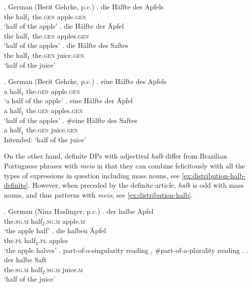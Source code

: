 \ex. German (Berit Gehrke, p.c.)\label{ex:distribution-halfte-def}
\ag. die Hälfte des Apfels\label{ex:distribution-halfte-sg-def}\\
the half$_1$ the\textsc{.gen} apple\textsc{.gen} \\
`half of the apple'
\bg. die Hälfte der Äpfel\label{ex:distribution-halfte-pl-def}\\
the half$_1$ the\textsc{.gen}  apples\textsc{.gen} \\
`half of the apples'
\bg. die Hälfte des Saftes\label{ex:distribution-halfte-mass-def}\\
the half$_1$ the\textsc{.gen}  juice\textsc{.gen} \\
`half of the juice'

\ex. German (Berit Gehrke, p.c.)\label{ex:distribution-halfte}
\ag. eine Hälfte des Apfels\label{ex:distribution-halfte-sg}\\
a half$_1$ the\textsc{.gen} apple\textsc{.gen} \\
`a half of the apple'
\bg. eine Hälfte der Äpfel\label{ex:distribution-halfte-pl}\\
a half$_1$ the\textsc{.gen}  apples\textsc{.gen} \\
`half of the apples'
\bg. \#eine Hälfte des Saftes\label{ex:distribution-halfte-mass}\\
a half$_1$ the\textsc{.gen}  juice\textsc{.gen} \\
Intended: `half of the juice'

On the other hand, definite DPs with adjectival \textit{halb} differ from Brazilian Portuguese phrases with \textit{meio} in that they can combine felicitously with all the types of expressions in question including mass nouns, see \ref{ex:distribution-halb-definite}. However, when preceded by the definite article, \textit{halb} is odd with mass nouns, and thus patterns with \textit{meio}, see \ref{ex:distribution-halb}.\largerpage

\ex. German (Nina Haslinger, p.c.)\label{ex:distribution-halb-definite}
\ag. der halbe Apfel\label{ex:distribution-halb-definite-sg}\\
the\textsc{.sg.m} half$_{2}$\textsc{.sg.m} apple\textsc{.m}\\
`the apple half'
\bg. die halben Äpfel\label{ex:distribution-halb-definite-pl}\\
the\textsc{.pl} half$_{2}$\textsc{.pl} apples\\
`the apple halves'
\a. part-of-a-singularity reading
\b. \#part-of-a-plurality reading
\z.
\bg. der halbe Saft\label{ex:distribution-halb-definite-mass}\\
the\textsc{.sg.m} half$_{2}$\textsc{.sg.m} juice\textsc{.m}\\
`half of the juice'

